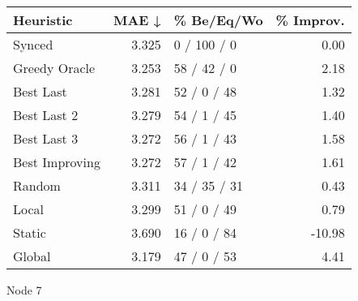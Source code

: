 \begin{tabular}{lrlr}
\toprule
\textbf{Heuristic} & \textbf{MAE ↓} & \textbf{\% Be/Eq/Wo} & \textbf{\% Improv.} \\
\midrule
            Synced &          3.325 &          0 / 100 / 0 &                0.00 \\
     Greedy Oracle &          3.253 &          58 / 42 / 0 &                2.18 \\
         Best Last &          3.281 &          52 / 0 / 48 &                1.32 \\
       Best Last 2 &          3.279 &          54 / 1 / 45 &                1.40 \\
       Best Last 3 &          3.272 &          56 / 1 / 43 &                1.58 \\
    Best Improving &          3.272 &          57 / 1 / 42 &                1.61 \\
            Random &          3.311 &         34 / 35 / 31 &                0.43 \\
             Local &          3.299 &          51 / 0 / 49 &                0.79 \\
            Static &          3.690 &          16 / 0 / 84 &              -10.98 \\
            Global &          3.179 &          47 / 0 / 53 &                4.41 \\
\bottomrule
\end{tabular}
\caption{Node 7}
\label{tab:ds_iid_lr01_le2_bs4_7}
